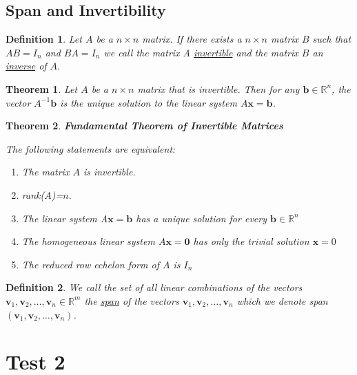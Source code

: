 \documentclass{article}
\theoremstyle{definitionstyle}
\newtheorem{definition}{Definition}[section]
\newtheorem{theorem}{Theorem}[section]
\begin{document}
\subsection{Span and Invertibility}

\begin{definition}
    Let $A$ be a $n \times n$ matrix. If there exists a $n \times n$ matrix $B$ such that
    $AB=I_n$ and $BA=I_n$ we call the matrix A \underline{invertible} and the matrix $B$ an \underline{inverse}
    of $A$.
\end{definition}

\begin{theorem}
    Let $A$ be a $n \times n$ matrix that is invertible. Then for any $\mathbf{b} \in \mathbb{R}^n$,
    the vector $A^{-1}\mathbf{b}$ is the unique solution to the linear system $A\mathbf{x}=\mathbf{b}$.
\end{theorem}

\begin{theorem}
    \textbf{Fundamental Theorem of Invertible Matrices}

    The following statements are equivalent:
    \begin{enumerate}
        \item The matrix $A$ is invertible.
        \item rank($A$)=$n$.
        \item The linear system A$\mathbf{x}=\mathbf{b}$ has a unique solution for every $\mathbf{b} \in \mathbb{R}^n$
        \item The homogeneous linear system $A\mathbf{x}=\mathbf{0}$ has only the trivial solution $\mathbf{x}=0$
        \item The reduced row echelon form of $A$ is $I_n$
    \end{enumerate}
\end{theorem}

\begin{definition}
    We call the set of all linear combinations of the vectors $\mathbf{v}_1,\mathbf{v}_2,\dots,\mathbf{v}_n \in \mathbb{R}^m$
    the \underline{span} of the vectors $\mathbf{v}_1,\mathbf{v}_2,\dots,\mathbf{v}_n$ which we denote
    span$(\mathbf{v}_1,\mathbf{v}_2,\dots,\mathbf{v}_n)$.
\end{definition}

\section{Test 2}
\end{document}
